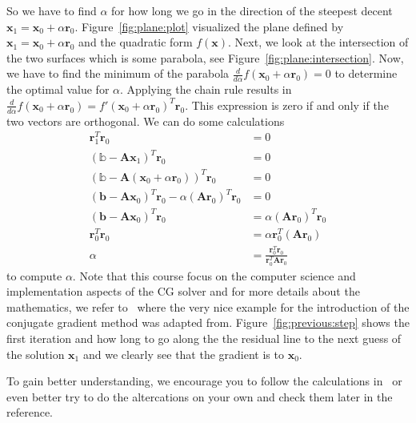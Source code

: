 So we have to find $\alpha$ for how long we go in the direction of the steepest decent $\mathbf{x}_1 = \mathbf{x}_0 + \alpha \mathbf{r}_0$. Figure~\ref{fig:plane:plot} visualized the plane defined by $\mathbf{x}_1 = \mathbf{x}_0 + \alpha \mathbf{r}_0$ and the quadratic form $f(\mathbf{x})$. Next, we look at the intersection of the two surfaces which is some parabola, see Figure~\ref{fig:plane:intersection}. Now, we have to find the minimum of the parabola $\frac{d}{d\alpha} f(\mathbf{x}_0 + \alpha \mathbf{r}_0) = 0$ to determine the optimal value for $\alpha$. Applying the chain rule results in $\frac{d}{d\alpha} f(\mathbf{x}_0 + \alpha \mathbf{r}_0)= f'(\mathbf{x}_0 + \alpha \mathbf{r}_0)^T \mathbf{r}_0$. This expression is zero if and only if the two vectors are orthogonal. We can do some calculations
\begin{align}
\mathbf{r}^T_1 \mathbf{r}_0 &= 0 \\
(\mathbb{b}-\mathbf{A} \mathbf{x}_1)^T \mathbf{r}_0 & = 0 \\
(\mathbb{b}-\mathbf{A} (\mathbf{x}_0 + \alpha \mathbf{r}_0))^T \mathbf{r}_0 & = 0 \\
(\mathbf{b}- \mathbf{A} \mathbf{x}_0)^T \mathbf{r}_0 - \alpha(\mathbf{A}\mathbf{r}_0)^T \mathbf{r}_0 &= 0 \\
(\mathbf{b}- \mathbf{A} \mathbf{x}_0)^T \mathbf{r}_0  &= \alpha(\mathbf{A}\mathbf{r}_0)^T \mathbf{r}_0 \\
\mathbf{r}^T_0 \mathbf{r}_0 &= \alpha \mathbf{r}^T_0 (\mathbf{A}\mathbf{r}_0) \\
\alpha &= \frac{\mathbf{r}^T_0 \mathbf{r}_0}{\mathbf{r}^T_0 \mathbf{A}\mathbf{r}_0}
\end{align}
to compute $\alpha$. Note that this course focus on the computer science and implementation aspects of the CG solver and for more details about the mathematics, we refer to~\cite{shewchuk1994introduction} where the very nice example for the introduction of the conjugate gradient method was adapted from. Figure~\ref{fig:previous:step} shows the first iteration and how long to go along the the residual line to the next guess of the solution $\mathbf{x}_1$ and we clearly see that the gradient is to $\mathbf{x}_0$.\\

\begin{exercise}
To gain better understanding, we encourage you to follow the calculations in~\cite{shewchuk1994introduction} or even better try to do the altercations on your own and check them later in the reference.
\end{exercise}

